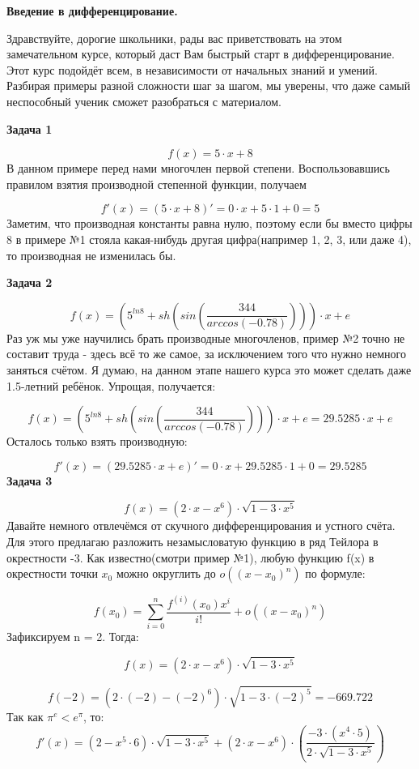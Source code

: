 \documentclass[12pt,a4paper,fleqn]{article}
\begin{document}
\begin{center}
{\bf \Large
Введение в дифференцирование.
}
\end{center}
Здравствуйте, дорогие школьники, рады вас приветствовать на этом замечательном курсе, который даст Вам быстрый старт в дифференцирование. Этот курс подойдёт всем, в независимости от начальных знаний и умений. Разбирая примеры разной сложности шаг за шагом, мы уверены, что даже самый неспособный ученик сможет разобраться с материалом.


\newpage
{\bf \Large
Задача 1
}

$$
f(x)=5\cdot x+8
$$
В данном примере перед нами многочлен первой степени. Воспользовавшись правилом взятия производной степенной функции, получаем

$$
f'(x)=(5\cdot x+8)'=0\cdot x+5\cdot1+0=5
$$
Заметим, что производная константы равна нулю, поэтому если бы вместо цифры 8 в примере №1 стояла какая-нибудь другая цифра(например 1, 2, 3, или даже 4), то производная не изменилась бы.

{\bf \Large
Задача 2
}

$$
f(x)=\left(5^{ ln8}+ sh\left( sin\left(\frac{344}{ arccos\left(-0.78\right)}\right)\right)\right)\cdot x+e
$$
Раз уж мы уже научились брать производные многочленов, пример №2 точно не составит труда - здесь всё то же самое, за исключением того что нужно немного заняться счётом. Я думаю, на данном этапе нашего курса это может сделать даже 1.5-летний ребёнок. Упрощая, получается:

$$
f(x)=\left(5^{ ln8}+ sh\left( sin\left(\frac{344}{ arccos\left(-0.78\right)}\right)\right)\right)\cdot x+e=29.5285\cdot x+e
$$
Осталось только взять производную:

$$
f'(x)=(29.5285\cdot x+e)'=0\cdot x+29.5285\cdot1+0=29.5285
$$
{\bf \Large
Задача 3
}

$$
f(x)=\left(2\cdot x- x^{6}\right)\cdot\sqrt{1-3\cdot x^{5}}
$$
Давайте немного отвлечёмся от скучного дифференцирования и устного счёта. Для этого предлагаю разложить незамысловатую функцию в ряд Тейлора в окрестности -3.
Как известно(смотри пример №1), любую функцию f(x) в окрестности точки $x_{0}$ можно округлить до $o((x-x_{0})^{n})$ по формуле:

$$
f(x_{0})=\sum_{i=0}^{n}\frac{f^{(i)}(x_{0})x^i}{i!} + o((x-x_{0})^{n})
$$
Зафиксируем n = 2. Тогда:

$$
f(x)=\left(2\cdot x- x^{6}\right)\cdot\sqrt{1-3\cdot x^{5}}
$$

$$
f(-2)=\left(2\cdot(-2)-(-2)^{6}\right)\cdot\sqrt{1-3\cdot(-2)^{5}}=-669.722
$$
Так как $\pi^{e}<e^{\pi}$, то:
$$
f'(x)=\left(2- x^{5}\cdot6\right)\cdot\sqrt{1-3\cdot x^{5}}+\left(2\cdot x- x^{6}\right)\cdot\left(\frac{-3\cdot\left( x^{4}\cdot5\right)}{2\cdot\sqrt{1-3\cdot x^{5}}}\right)
$$
\end{document}
